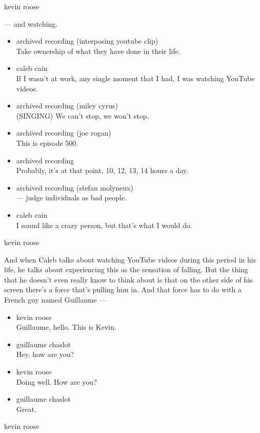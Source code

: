 kevin roose

--- and watching.

\begin{itemize}
\item
  archived recording (interposing youtube clip)\\
  Take ownership of what they have done in their life.
\item
  caleb cain\\
  If I wasn't at work, any single moment that I had, I was watching
  YouTube videos.
\item
  archived recording (miley cyrus)\\
  (SINGING) We can't stop, we won't stop.
\item
  archived recording (joe rogan)\\
  This is episode 500.
\item
  archived recording\\
  Probably, it's at that point, 10, 12, 13, 14 hours a day.
\item
  archived recording (stefan molyneux)\\
  --- judge individuals as bad people.
\item
  caleb cain\\
  I sound like a crazy person, but that's what I would do.
\end{itemize}

kevin roose

And when Caleb talks about watching YouTube videos during this period in
his life, he talks about experiencing this as the sensation of falling.
But the thing that he doesn't even really know to think about is that on
the other side of his screen there's a force that's pulling him in. And
that force has to do with a French guy named Guillaume ---

\begin{itemize}
\item
  kevin roose\\
  Guillaume, hello. This is Kevin.
\item
  guillaume chaslot\\
  Hey, how are you?
\item
  kevin roose\\
  Doing well. How are you?
\item
  guillaume chaslot\\
  Great.
\end{itemize}

kevin roose

